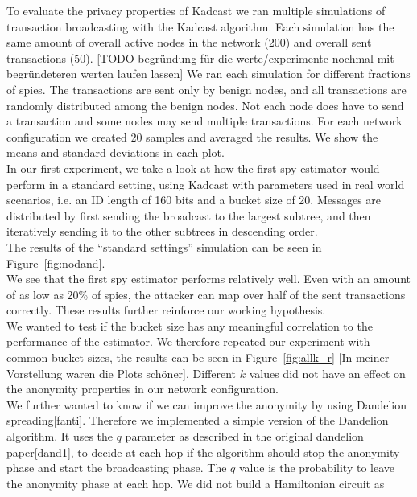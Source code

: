 To evaluate the privacy properties of Kadcast we ran multiple simulations of
transaction broadcasting with the Kadcast algorithm. Each simulation has
the same amount of overall active nodes in the network (200) and overall
sent transactions (50). [TODO begründung für die werte/experimente
nochmal mit begründeteren werten laufen lassen]
We ran each simulation for different fractions of spies.
The transactions are sent only by benign nodes, and all transactions are
randomly distributed among the benign nodes. Not each node does have to
send a transaction and some nodes may send multiple transactions.
For each network configuration we created 20 samples and averaged the
results. We show the means and standard deviations in each plot. \\
In our first experiment, we take a look at how the first spy estimator would perform in a standard setting,
using Kadcast with parameters used in real world scenarios, i.e. an
ID length of 160 bits and a bucket size of 20.
Messages are distributed by first sending the broadcast to the
largest subtree, and then iteratively sending it to the other subtrees in
descending order. \\
The results of the ``standard settings'' simulation can be seen in
Figure~\ref{fig:nodand}. \\
We see that the first spy estimator performs relatively well.
Even with an amount of as low as 20\% of spies, the attacker can
map over half of the sent transactions correctly.
These results further reinforce our working hypothesis. \\
We wanted to test if the bucket size has any
meaningful correlation to the performance of the estimator. We therefore
repeated our experiment with common bucket sizes, the results can be
seen in Figure~\ref{fig:allk_r} [In meiner
Vorstellung waren die Plots schöner].
Different $k$ values did not have an effect on the anonymity
properties in our network configuration. \\
We further wanted to know if we can improve the anonymity by using
Dandelion spreading[fanti].
Therefore we implemented a simple version of the Dandelion algorithm. It
uses the $q$ parameter as described in the original dandelion
paper[dand1],
to decide at each hop if the algorithm should stop the anonymity phase
and start the broadcasting phase. The $q$ value is the probability to leave
the anonymity phase at each hop. We did not build a Hamiltonian circuit as
